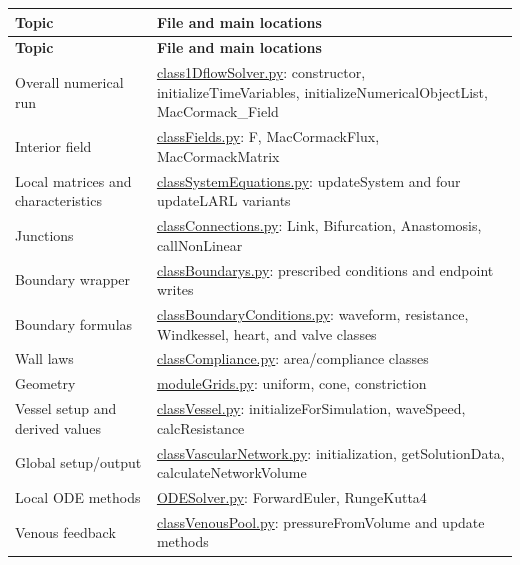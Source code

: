 \documentclass[11pt,a4paper]{article}
\begin{document}
\begingroup\footnotesize
\setlength{\tabcolsep}{4pt}
\begin{longtable}{>{\raggedright\arraybackslash}p{}>{\raggedright\arraybackslash}p{}}
\toprule
\textbf{Topic} & \textbf{File and main locations} \\
\midrule
\endfirsthead
\textbf{Topic} & \textbf{File and main locations} \\
\midrule
\endhead
\bottomrule
\endfoot
Overall numerical run & \href{/home/sadid/starfish/SolverLib/class1DflowSolver.py}{class1DflowSolver.py}: constructor, initializeTimeVariables, initializeNumericalObjectList, MacCormack\_Field \\
Interior field & \href{/home/sadid/starfish/SolverLib/classFields.py}{classFields.py}: F, MacCormackFlux, MacCormackMatrix \\
Local matrices and characteristics & \href{/home/sadid/starfish/SolverLib/classSystemEquations.py}{classSystemEquations.py}: updateSystem and four updateLARL variants \\
Junctions & \href{/home/sadid/starfish/SolverLib/classConnections.py}{classConnections.py}: Link, Bifurcation, Anastomosis, callNonLinear \\
Boundary wrapper & \href{/home/sadid/starfish/SolverLib/classBoundarys.py}{classBoundarys.py}: prescribed conditions and endpoint writes \\
Boundary formulas & \href{/home/sadid/starfish/NetworkLib/classBoundaryConditions.py}{classBoundaryConditions.py}: waveform, resistance, Windkessel, heart, and valve classes \\
Wall laws & \href{/home/sadid/starfish/NetworkLib/classCompliance.py}{classCompliance.py}: area/compliance classes \\
Geometry & \href{/home/sadid/starfish/NetworkLib/moduleGrids.py}{moduleGrids.py}: uniform, cone, constriction \\
Vessel setup and derived values & \href{/home/sadid/starfish/NetworkLib/classVessel.py}{classVessel.py}: initializeForSimulation, waveSpeed, calcResistance \\
Global setup/output & \href{/home/sadid/starfish/NetworkLib/classVascularNetwork.py}{classVascularNetwork.py}: initialization, getSolutionData, calculateNetworkVolume \\
Local ODE methods & \href{/home/sadid/starfish/NetworkLib/ODESolver.py}{ODESolver.py}: ForwardEuler, RungeKutta4 \\
Venous feedback & \href{/home/sadid/starfish/NetworkLib/classVenousPool.py}{classVenousPool.py}: pressureFromVolume and update methods \\

\end{longtable}
\end{document}
